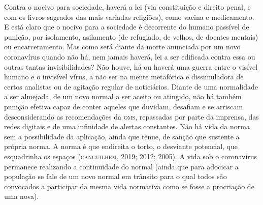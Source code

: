 Contra o nocivo para sociedade, haverá a lei (via constituição e direito
penal, e com os livros sagrados das mais variadas religiões), como
vacina e medicamento. E está claro que o nocivo para a sociedade é
decorrente do humano passível de punição, por isolamento, asilamento (de
refugiado, de velhos, de doentes mentais) ou encarceramento. Mas como
será diante da morte anunciada por um novo coronavírus quando não há,
nem jamais haverá, lei a ser edificada contra essa ou outras tantas
invisibilidades? Não houve, há ou haverá uma guerra entre o visível
humano e o invisível vírus, a não ser na mente metafórica e
dissimuladora de certos analistas ou de agitação regular de noticiários.
Diante de uma normalidade a ser almejada, de um novo normal a ser aceito
ou atingido, não há também punição efetiva capaz de conter aqueles que
duvidam, desafiam e se arriscam desconsiderando as recomendações da \textsc{oms},
repassadas por parte da imprensa, das redes digitais e de uma infinidade
de alertas constantes. Não há vida da norma sem a possibilidade da
aplicação, ainda que tênue, de sanção que sustente a própria norma. A
norma é que endireita o torto, o desviante potencial, que esquadrinha os
espaços (\textsc{canguilhem}, 2019; 2012; 2005). A vida sob o coronavírus
permanece realizando a continuidade do normal (ainda que para adocicar a
população se fale de um novo normal em trânsito para o qual todos são
convocados a participar da mesma vida normativa como se fosse a
procriação de uma nova).

